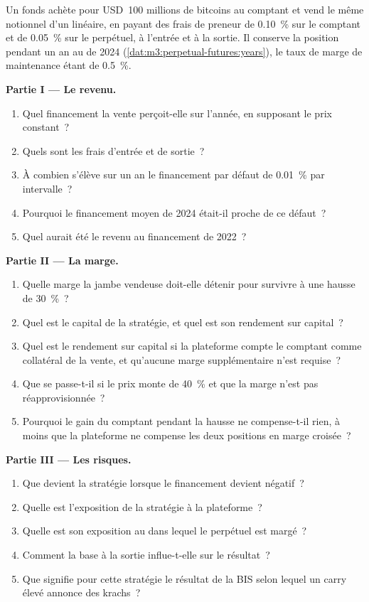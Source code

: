 \begin{problem}\label{pb:m3:perpetual-futures:1}
Un fonds achète pour USD~100 millions de bitcoins au comptant et vend le même notionnel d'un  linéaire, en payant des frais de preneur de
0.10~\% sur le comptant et de 0.05~\% sur le perpétuel, à l'entrée et à la sortie. Il conserve la position pendant un an au  de 2024
(\cref{dat:m3:perpetual-futures:years}), le taux de marge de maintenance étant de 0.5~\%.

\medskip\noindent\textbf{Partie I --- Le revenu.}
\begin{enumerate}
\item Quel financement la vente perçoit-elle sur l'année, en supposant le prix constant~?
\item Quels sont les frais d'entrée et de sortie~?
\item À combien s'élève sur un an le financement par défaut de 0.01~\% par intervalle~?
\item Pourquoi le financement moyen de 2024 était-il proche de ce défaut~?
\item Quel aurait été le revenu au financement de 2022~?
\end{enumerate}

\medskip\noindent\textbf{Partie II --- La marge.}
\begin{enumerate}[resume]
\item Quelle marge la jambe vendeuse doit-elle détenir pour survivre à une hausse de 30~\%~?
\item Quel est le capital de la stratégie, et quel est son rendement sur capital~?
\item Quel est le rendement sur capital si la plateforme compte le comptant comme collatéral de la vente, et qu'aucune marge
supplémentaire n'est requise~?
\item Que se passe-t-il si le prix monte de 40~\% et que la marge n'est pas réapprovisionnée~?
\item Pourquoi le gain du comptant pendant la hausse ne compense-t-il rien, à moins que la plateforme ne compense les deux positions en marge croisée~?
\end{enumerate}

\medskip\noindent\textbf{Partie III --- Les risques.}
\begin{enumerate}[resume]
\item Que devient la stratégie lorsque le financement devient négatif~?
\item Quelle est l'exposition de la stratégie à la plateforme~?
\item Quelle est son exposition au  dans lequel le perpétuel est margé~?
\item Comment la base à la sortie influe-t-elle sur le résultat~?
\item Que signifie pour cette stratégie le résultat de la BIS selon lequel un carry élevé annonce des krachs~?
\end{enumerate}


\end{problem}
